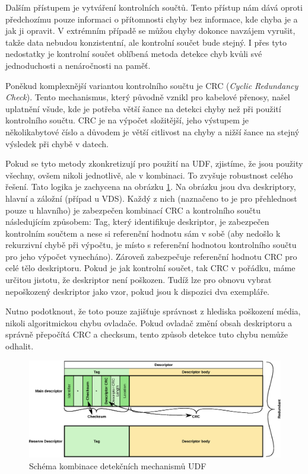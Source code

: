 Dalším přístupem je vytváření kontrolních součtů. Tento přístup nám dává oproti předchozímu pouze informaci o přítomnosti chyby bez informace, kde chyba je a jak ji opravit. V extrémním případě se můžou chyby dokonce navzájem vyrušit, takže data nebudou konzistentní, ale kontrolní součet bude stejný. I přes tyto nedostatky je kontrolní součet oblíbená metoda detekce chyb kvůli své jednoduchosti a nenáročnosti na paměť.

Poněkud komplexnější variantou kontrolního součtu je CRC (\textit{Cyclic Redundancy Check}). Tento mechanismus, který původně vznikl pro kabelové přenosy, našel uplatnění všude, kde je potřeba větší šance na detekci chyby než při použití kontrolního součtu. CRC je na výpočet složitější, jeho výstupem je několikabytové číslo a důvodem je větší citlivost na chyby a nižší šance na stejný výsledek při chybě v datech.

Pokud se tyto metody zkonkretizují pro použití na UDF, zjistíme, že jsou použity všechny, ovšem nikoli jednotlivě, ale v kombinaci. To zvyšuje robustnost celého řešení. Tato logika je zachycena na obrázku \ref{fig:detch}. Na obrázku jsou dva deskriptory, hlavní a záložní (případ u VDS). Každý z nich (naznačeno to je pro přehlednost pouze u hlavního) je zabezpečen kombinací CRC a kontrolního součtu následujícím způsobem: Tag, který identifikuje deskriptor, je zabezpečen kontrolním součtem a nese si referenční hodnotu sám v sobě (aby nedošlo k rekurzivní chybě při výpočtu, je místo s referenční hodnotou kontrolního součtu pro jeho výpočet vynecháno). Zároveň zabezpečuje referenční hodnotu CRC pro celé tělo deskriptoru. Pokud je  jak kontrolní součet, tak CRC v pořádku, máme určitou jistotu, že deskriptor není poškozen. Tudíž lze pro obnovu vybrat nepoškozený deskriptor jako vzor, pokud jsou k dispozici dva exempláře.

Nutno podotknout, že toto pouze zajišťuje správnost z hlediska poškození média, nikoli algoritmickou chybu ovladače. Pokud ovladač změní obsah deskriptoru a správně přepočítá CRC a checksum, tento způsob detekce tuto chybu nemůže odhalit.
\begin{figure}[] 
    \centering
    \includegraphics[scale=0.65]{obrazky/det-ch.eps}
    \caption{Schéma kombinace detekčních mechanismů UDF}
    \label{fig:detch}
\end{figure}

